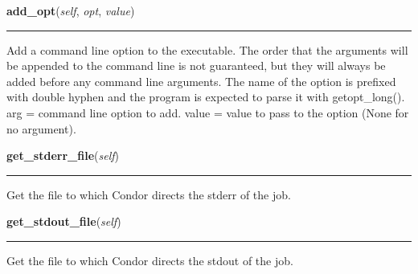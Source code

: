     \label{pipeline:CondorJob:add_opt}
    \vspace{0.5ex}

    \noindent\begin{boxedminipage}{\textwidth}

    \raggedright \textbf{add\_opt}(\textit{self}, \textit{opt}, \textit{value})

    \vspace{-1.5ex}

    \rule{\textwidth}{0.5\fboxrule}
    Add a command line option to the executable. The order that the 
    arguments will be appended to the command line is not guaranteed, but 
    they will always be added before any command line arguments. The name 
    of the option is prefixed with double hyphen and the program is 
    expected to parse it with getopt\_long(). arg = command line option 
    to add. value = value to pass to the option (None for no argument).

    \vspace{1ex}

    \end{boxedminipage}

    \label{pipeline:CondorJob:get_stderr_file}
    \vspace{0.5ex}

    \noindent\begin{boxedminipage}{\textwidth}

    \raggedright \textbf{get\_stderr\_file}(\textit{self})

    \vspace{-1.5ex}

    \rule{\textwidth}{0.5\fboxrule}
    Get the file to which Condor directs the stderr of the job.

    \vspace{1ex}

    \end{boxedminipage}

    \label{pipeline:CondorJob:get_stdout_file}
    \vspace{0.5ex}

    \noindent\begin{boxedminipage}{\textwidth}

    \raggedright \textbf{get\_stdout\_file}(\textit{self})

    \vspace{-1.5ex}

    \rule{\textwidth}{0.5\fboxrule}
    Get the file to which Condor directs the stdout of the job.

    \vspace{1ex}

    \end{boxedminipage}

